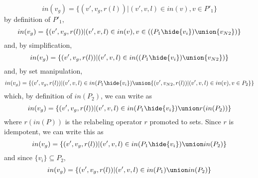 \[
in(v_g) = \{(v',v_g,r(l))|(v',v,l) \in in(v), v\in P'_1\}
\]
\noindent
by definition of $P'_1$,
\[
in(v_g) = \{(v',v_g,r(l))|(v',v,l) \in in(v), v\in((P_1\hide\{v_i\})\union\{v_{N2}\})\}
\]
\noindent
and,  by simplification, 
\[
in(v_g) = \{(v',v_g,r(l))|(v',v,l) \in in((P_1\hide\{v_i\}) \union \{v_{N2}\})\}
\]
\noindent
and, by set manipulation, 
\[
in(v_g) = \{(v',v_g,r(l))|(v',v,l) \in in(P_1\hide\{v_i\}) \union  \{(v',v_{N2},r(l))|(v',v,l)\in in(v), v\in P_2\}\}
\]
\noindent
which, by definition of $in(P_2)$, we can write as
\[
in(v_g) = \{(v',v_g,r(l))|(v',v,l) \in in(P_1\hide\{v_i\}) \union  r(in(P_2))\}
\]
\noindent
where $r(in(P))$ is the relabeling operator $r$ promoted to sets.  Since $r$ is idempotent, we can write this as
\[
in(v_g) = \{(v',v_g,r(l))|(v',v,l) \in in(P_1\hide\{v_i\}) \union  in(P_2)\}
\]
\noindent
and since $\{v_i\} \subseteq P_2$, 
\[
in(v_g) = \{(v',v_g,r(l))|(v',v,l) \in in(P_1) \union  in(P_2)\}
\]
